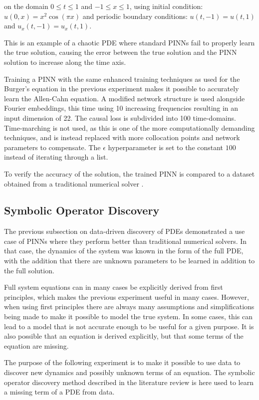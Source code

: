 \noindent on the domain $0 \leq t \leq 1$ and $-1 \leq x \leq 1$, using initial condition: $u(0, x) = x^2 \cos(\pi x)$ and periodic boundary conditions: $u(t, -1) = u(t, 1)$ and $u_x(t, -1) = u_x(t, 1)$.

This is an example of a chaotic PDE where standard PINNs fail to properly learn the true solution, causing the error between the true solution and the PINN solution to increase along the time axis.

Training a PINN with the same enhanced training techniques as used for the Burger's equation in the previous experiment makes it possible to accurately learn the Allen-Cahn equation. A modified network structure is used alongside Fourier embeddings, this time using 10 increasing frequencies resulting in an input dimension of 22. The causal loss is subdivided into 100 time-domains. Time-marching is not used, as this is one of the more computationally demanding techniques, and is instead replaced with more collocation points and network parameters to compensate. The $\epsilon$ hyperparameter is set to the constant $100$ instead of iterating through a list.

To verify the accuracy of the solution, the trained PINN is compared to a dataset obtained from a traditional numerical solver \cite{pinncausalitygithub}.

\subsection{Symbolic Operator Discovery}

The previous subsection on data-driven discovery of PDEs demonstrated a use case of PINNs where they perform better than traditional numerical solvers. In that case, the dynamics of the system was known in the form of the full PDE, with the addition that there are unknown parameters to be learned in addition to the full solution.

Full system equations can in many cases be explicitly derived from first principles, which makes the previous experiment useful in many cases. However, when using first principles there are always many assumptions and simplifications being made to make it possible to model the true system. In some cases, this can lead to a model that is not accurate enough to be useful for a given purpose. It is also possible that an equation is derived explicitly, but that some terms of the equation are missing.

The purpose of the following experiment is to make it possible to use data to discover new dynamics and possibly unknown terms of an equation. The symbolic operator discovery method described in the literature review is here used to learn a missing term of a PDE from data.

